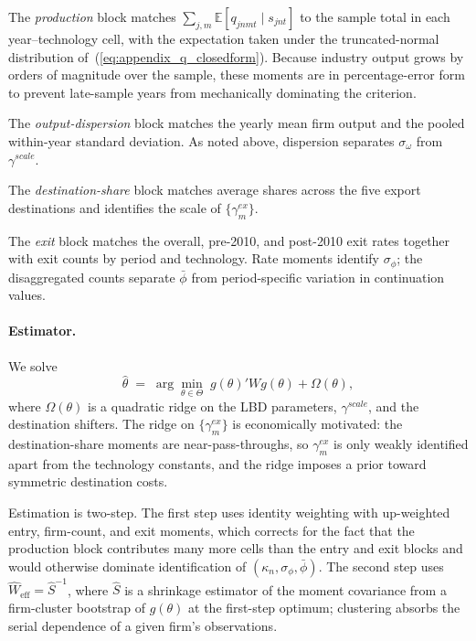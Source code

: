 \documentclass[12pt]{article}
\begin{document}
The \emph{production} block matches $\sum_{j,m}\mathbb{E}[q_{jnmt}\mid s_{jnt}]$ to the sample total in each year--technology cell, with the expectation taken under the truncated-normal distribution of~(\ref{eq:appendix_q_closedform}). Because industry output grows by orders of magnitude over the sample, these moments are in percentage-error form to prevent late-sample years from mechanically dominating the criterion.
 
The \emph{output-dispersion} block matches the yearly mean firm output and the pooled within-year standard deviation. As noted above, dispersion separates $\sigma_\omega$ from $\gamma^{scale}$.
 
The \emph{destination-share} block matches average shares across the five export destinations and identifies the scale of $\{\gamma^{ex}_m\}$.
 
The \emph{exit} block matches the overall, pre-2010, and post-2010 exit rates together with exit counts by period and technology. Rate moments identify $\sigma_\phi$; the disaggregated counts separate $\bar\phi$ from period-specific variation in continuation values.
 
\paragraph{Estimator.} We solve
\begin{equation}
\hat\theta \;=\; \arg\min_{\theta\in\Theta}\; g(\theta)'Wg(\theta) + \Omega(\theta),
\label{eq:appendix_gmm_obj}
\end{equation}
where $\Omega(\theta)$ is a quadratic ridge on the LBD parameters, $\gamma^{scale}$, and the destination shifters. The ridge on $\{\gamma^{ex}_m\}$ is economically motivated: the destination-share moments are near-pass-throughs, so $\gamma^{ex}_m$ is only weakly identified apart from the technology constants, and the ridge imposes a prior toward symmetric destination costs.
 
Estimation is two-step. The first step uses identity weighting with up-weighted entry, firm-count, and exit moments, which corrects for the fact that the production block contributes many more cells than the entry and exit blocks and would otherwise dominate identification of $(\kappa_n,\sigma_\phi,\bar\phi)$. The second step uses $\hat W_{\text{eff}} = \hat S^{-1}$, where $\hat S$ is a shrinkage estimator of the moment covariance from a firm-cluster bootstrap of $g(\theta)$ at the first-step optimum; clustering absorbs the serial dependence of a given firm's observations.
 
\end{document}
